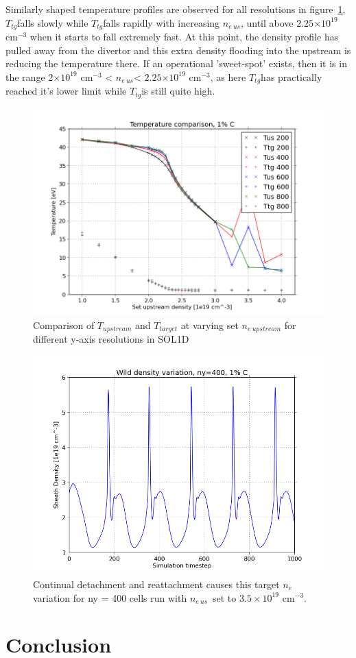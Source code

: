 \documentclass[11pt, twocolumn]{article}  %
\providecommand{\e}[1]{\ensuremath{\times 10^{#1}}} %
\providecommand{\noNe}[1]{{${#1}\times 10^{19}$ cm$^{-3}$}} %
\providecommand{\neus}{$n_{e~us}$} %
\providecommand{\Tus}{$T_{tg}$} %
\providecommand{\Ttg}{$T_{tg}$} %
\begin{document}
Similarly shaped temperature profiles are observed for all resolutions in figure~\ref{fig:TT_IMPCOMBO2}, \Tus falls slowly while \Ttg falls rapidly with increasing \neus, until above $2.25\e{19}$ cm$^{-3}$ when it starts to fall extremely fast. At this point, the density profile has pulled away from the divertor and this extra density flooding into the upstream is reducing the temperature there. If an operational 'sweet-spot' exists, then it is in the range $2\e{19}$ cm$^{-3}$ < \neus < $2.25\e{19}$ cm$^{-3}$, as here \Ttg has practically reached it's lower limit while \Tus is still quite high.

\begin{figure}
\includegraphics[scale=0.5]{Figures/sol1d/TT_IMPCOMBO2.png}
\centering
\caption{Comparison of $T_{upstream}$ and $T_{target}$ at varying set $n_{e~upstream}$ for different y-axis resolutions in SOL1D}\label{fig:TT_IMPCOMBO2}
\end{figure}


\begin{figure}
\includegraphics[scale=0.5]{Figures/sol1d/ny400r35netg.png}
\centering
\caption{Continual detachment and reattachment causes this target $n_e$ variation for ny = 400 cells run with \neus~set to \noNe{3.5}.}\label{fig:ny400r35netg}
\end{figure}


\section{Conclusion}\label{sec:Conclusion}




\printbibliography
\end{document}
